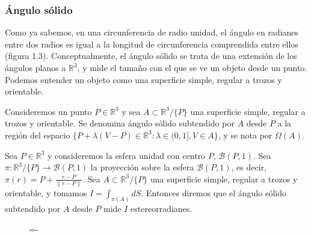 \subsubsection*{Ángulo sólido}

Como ya sabemos, en una circunferencia de radio unidad, el ángulo en radianes entre dos radios es igual a la longitud de circunferencia comprendida entre ellos (figura 1.3). Conceptualmente, el ángulo sólido se trata de una extensión de los ángulos planos a $\mathds{R}^3$, y mide el tamaño con el que se ve un objeto desde un punto. Podemos entender un objeto como una superficie simple, regular a trozos y orientable.

\begin{definicion}
  Consideremos un punto $P \in \mathds{R}^3$ y sea $A \subset \mathds{R}^3/\{P\}$ una superficie simple, regular a trozos y orientable. Se denomina ángulo sólido subtendido por $A$ desde $P$ a la región del espacio $\{P + \lambda (V-P) \in \mathds{R}^3 : \lambda \in (0,1], V \in A\}$, y se nota por $\Omega(A)$. 
\end{definicion}

\begin{definicion}
    Sea $P \in \mathds{R}^3$ y consideremos la esfera unidad con centro $P$, $\mathcal{B}(P,1)$. Sea $\pi :\mathds{R}^3/\{P\}\rightarrow \mathcal{B}(P,1)$ la proyección sobre la esfera $\mathcal{B}(P,1)$, es decir, $\pi(r) = P + \frac{r-P}{\|r-P\|}$. Sea $A \subset \mathds{R}^3/\{P\}$ una superficie simple, regular a trozos y orientable, y tomamos $I = \int _{\pi(A)} dS$. Entonces diremos que el ángulo sólido subtendido por $A$ desde $P$ mide $I$ estereorradianes.
\end{definicion}

\begin{figure}[h]
  \lineskip=-\fboxrule
\end{figure}

